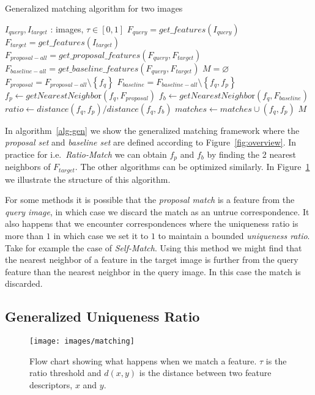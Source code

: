 \documentclass[journal]{IEEEtran}
\begin{document}
\begin{algorithm}[htb]
\caption{Generalized matching algorithm for two images}
\label{alg-gen}
\begin{algorithmic}
    \Require $I_{query}, I_{target}$ : images, $\tau \in [0,1]$
    \State $F_{query} = get\_features(I_{query})$
    \State $F_{target} = get\_features(I_{target})$
\State $F_{proposal-all} = get\_proposal\_features(F_{query}, 
F_{target})$
\State $F_{baseline-all} = get\_baseline\_features(F_{query}, 
F_{target})$
\State $M = \varnothing$
    \State $F_{proposal} = F_{proposal-all} \setminus 
    \left\{f_q\right\}$
    \State $F_{baseline} = F_{baseline-all} \setminus \left\{f_q, 
    f_p\right\}$
    \State $f_p \gets getNearestNeighbo\text{r}(f_q, F_{proposal})$
    \State $f_b \gets getNearestNeighbo\text{r}(f_q, F_{baseline})$
    \State $ratio \gets distance(f_q, f_p) / distance(f_q, f_b)$
        \State $matches \gets matches \cup \left(f_q, f_p\right)$
	\EndIf
\EndFor
\Return $M$
\end{algorithmic}
\end{algorithm}

In algorithm~\ref{alg-gen} we show the generalized matching framework 
where the \emph{proposal set} and \emph{baseline set} are defined 
according to Figure~\ref{fig:overview}.  In practice for i.e.\ 
\emph{Ratio-Match} we can obtain $f_p$ and $f_b$ by finding the 2 
nearest neighbors of $F_{target}$. The other algorithms can be optimized 
similarly. In Figure~\ref{fig:matching} we illustrate the structure of 
this algorithm.

For some methods it is possible that the \emph{proposal match} is a 
feature from the \emph{query image}, in which case we discard the match 
as an untrue correspondence.  It also happens that we encounter 
correspondences where the uniqueness ratio is more than $1$ in which 
case we set it to $1$ to maintain a bounded \emph{uniqueness ratio}.  
Take for example the case of \emph{Self-Match}. Using this method we 
might find that the nearest neighbor of a feature in the target image is 
further from the query feature than the nearest neighbor in the query 
image. In this case the match is discarded.

\subsection{Generalized Uniqueness Ratio}

\begin{figure}[t]
\centering
\texttt{[image: images/matching]}
\caption{Flow chart showing what happens when we match a feature. $\tau$ 
is the ratio threshold and $d(x,y)$ is the distance between two feature 
descriptors, $x$ and $y$.}
\label{fig:matching}
\end{figure}
%
\end{document}
